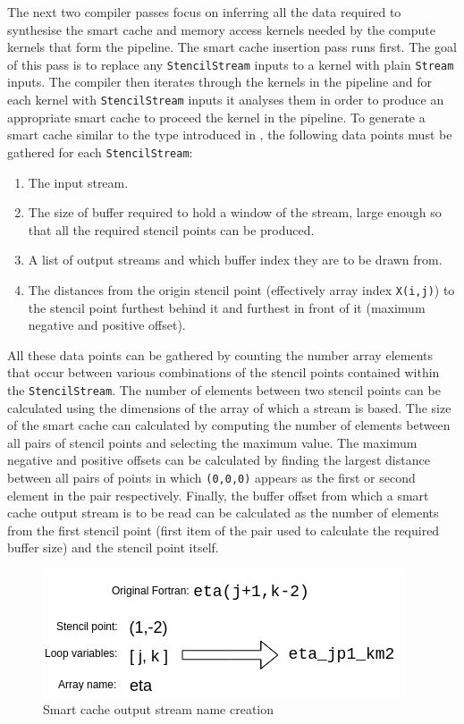 \documentclass{mpaper}
\begin{document}
The next two compiler passes focus on inferring all the data required to synthesise the smart cache and memory access kernels needed by the compute kernels that form the pipeline.
The smart cache insertion pass runs first.
The goal of this pass is to replace any \texttt{StencilStream} inputs to a kernel with plain \texttt{Stream} inputs.
The compiler then iterates through the kernels in the pipeline and for each kernel with \texttt{StencilStream} inputs it analyses them in order to produce an appropriate smart cache to proceed the kernel in the pipeline. 
To generate a smart cache similar to the type introduced in \cite{VanderbauwhedeNabi2018}, the following data points must be gathered for each \texttt{StencilStream}:

    \begin{enumerate}
    \item The input stream.
    \item The size of buffer required to hold a window of the stream, large enough so that all the required stencil points can be produced.
    \item A list of output streams and which buffer index they are to be drawn from.
    \item The distances from the origin stencil point (effectively array index \texttt{X(i,j)}) to the stencil point furthest behind it and furthest in front of it (maximum negative and positive offset).
\end{enumerate}

All these data points can be gathered by counting the number array elements that occur between various combinations of the stencil points contained within the \texttt{StencilStream}.
The number of elements between two stencil points can be calculated using the dimensions of the array of which a stream is based.
The size of the smart cache can calculated by computing the number of elements between all pairs of stencil points and selecting the maximum value.
The maximum negative and positive offsets can be calculated by finding the largest distance between all pairs of points in which \texttt{(0,0,0)} appears as the first or second element in the pair respectively.
Finally, the buffer offset from which a smart cache output stream is to be read can be calculated as the number of elements from the first stencil point (first item of the pair used to calculate the required buffer size) and the stencil point itself.

\begin{figure}
    \centering
    \includegraphics[scale=0.5]{images/rename_transform.png}
    \caption{Smart cache output stream name creation}
    \label{fig:stream_name_transform}
\end{figure}
\end{document}
